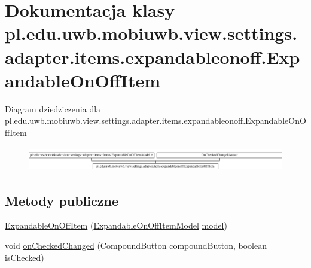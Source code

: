 \hypertarget{classpl_1_1edu_1_1uwb_1_1mobiuwb_1_1view_1_1settings_1_1adapter_1_1items_1_1expandableonoff_1_1_expandable_on_off_item}{}\section{Dokumentacja klasy pl.\+edu.\+uwb.\+mobiuwb.\+view.\+settings.\+adapter.\+items.\+expandableonoff.\+Expandable\+On\+Off\+Item}
\label{classpl_1_1edu_1_1uwb_1_1mobiuwb_1_1view_1_1settings_1_1adapter_1_1items_1_1expandableonoff_1_1_expandable_on_off_item}
Diagram dziedziczenia dla pl.\+edu.\+uwb.\+mobiuwb.\+view.\+settings.\+adapter.\+items.\+expandableonoff.\+Expandable\+On\+Off\+Item\begin{figure}[H]
\begin{center}
\leavevmode
\includegraphics[height=1.087379cm]{classpl_1_1edu_1_1uwb_1_1mobiuwb_1_1view_1_1settings_1_1adapter_1_1items_1_1expandableonoff_1_1_expandable_on_off_item}
\end{center}
\end{figure}
\subsection*{Metody publiczne}
\begin{DoxyCompactItemize}
\item 
\hyperlink{classpl_1_1edu_1_1uwb_1_1mobiuwb_1_1view_1_1settings_1_1adapter_1_1items_1_1expandableonoff_1_1_expandable_on_off_item_abd91cd0ca8f9393e63243933b8c57201}{Expandable\+On\+Off\+Item} (\hyperlink{classpl_1_1edu_1_1uwb_1_1mobiuwb_1_1view_1_1settings_1_1adapter_1_1items_1_1expandableonoff_1_1_expandable_on_off_item_model}{Expandable\+On\+Off\+Item\+Model} \hyperlink{classpl_1_1edu_1_1uwb_1_1mobiuwb_1_1view_1_1settings_1_1adapter_1_1items_1_1_item_a318c5a53677362bdb6d6324d8f132ba6}{model})
\item 
void \hyperlink{classpl_1_1edu_1_1uwb_1_1mobiuwb_1_1view_1_1settings_1_1adapter_1_1items_1_1expandableonoff_1_1_expandable_on_off_item_a95482ff8e6860be4906b8064f26f4fde}{on\+Checked\+Changed} (Compound\+Button compound\+Button, boolean is\+Checked)
\end{DoxyCompactItemize}
